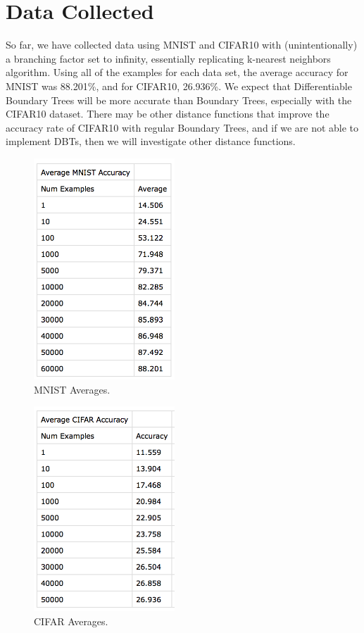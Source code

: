 \documentclass[10pt,letterpaper]{article}
\begin{document}
	\section{Data Collected}
		So far, we have collected data using MNIST and CIFAR10 with (unintentionally) a branching factor set to infinity, essentially replicating k-nearest neighbors algorithm. Using all of the examples for each data set, the average accuracy for MNIST was 88.201\%, and for CIFAR10, 26.936\%. We expect that Differentiable Boundary Trees will be more accurate than Boundary Trees, especially with the CIFAR10 dataset. There may be other distance functions that improve the accuracy rate of CIFAR10 with regular Boundary Trees, and if we are not able to implement DBTs, then we will investigate other distance functions.
			\begin{figure}
			\includegraphics[width=150pt]{1.png}
			\caption{MNIST Averages.}
			\label{fig:1}
		\end{figure}
		\begin{figure}
			\includegraphics[width=150pt]{2.png}
			\caption{CIFAR Averages.}
			\label{fig:2}
		\end{figure}
\end{document}
